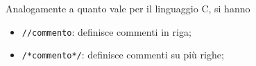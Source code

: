 \documentclass{subfiles}
\begin{document}
    Analogamente a quanto vale per il linguaggio C, si hanno
    \begin{itemize}
        \item \lstinline[style = Java]{//commento}: definisce commenti in riga;
        \item \lstinline[style = Java]{/*commento*/}: definisce commenti su più righe;
    \end{itemize}
\end{document}
